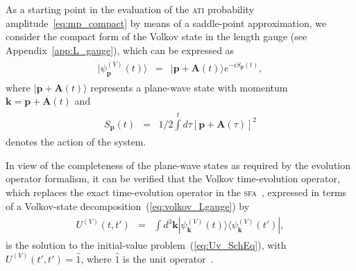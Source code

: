 As a starting point in the evaluation of the \textsc{ati} probability
amplitude~\ref{eq:mp_compact} by means of a saddle-point
approximation, we consider the compact form of the Volkov state in the
length gauge (see Appendix~\ref{app:L_gauge}), which can be expressed
as~\cite{Becker_ati2002}
%
\begin{eqnarray}
\label{eq:volkov_Lgauge}
\begin{split}
|\psi_{\mathbf{p}}^{(V)}(t)\rangle & = &
|\mathbf{p} + \mathbf{A}(t)\rangle e^{-i S_{\mathbf{p}}(t)},
\end{split}
\end{eqnarray}
%
where $|\mathbf{p} + \mathbf{A}(t)\rangle$ represents a plane-wave
state with momentum $\mathbf{k} = \mathbf{p} + \mathbf{A}(t)$ and
%
\begin{eqnarray}
  \begin{split}
    S_{\mathbf{p}}(t) & = & 1/2 \int\limits^{t} d\tau
    [\mathbf{p} + \mathbf{A}(\tau)]^{2}
  \end{split}
  \label{eq:action_system}
\end{eqnarray}
%
denotes the action of the system.

In view of the completeness of the plane-wave states as required by
the evolution operator formalism, it can be verified that the Volkov
time-evolution operator, which replaces the exact time-evolution
operator in the \textsc{sfa}~\cite{KeldyshSFA},
expressed in terms of a Volkov-state
decomposition~(\ref{eq:volkov_Lgauge}) by
%
\begin{eqnarray}
\label{eq:te_volkov}
\begin{split}
U^{(V)}(t,t') & = & \int d^{3}\mathbf{k}
|\psi_{\mathbf{k}}^{(V)}(t) \rangle
\langle \psi_{\mathbf{k}}^{(V)}(t')|,
\end{split}
\end{eqnarray}
%
is the solution to the initial-value problem~(\ref{eq:Uv_SchEq}), with
$U^{(V)}(t',t') = \hat{1}$, where $\hat{1}$ is the unit
operator~\cite{BeckerTEOp_2006,cjp2010_keldysh}.

